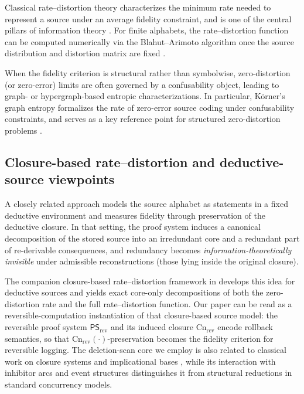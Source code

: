 \documentclass[twoside]{article}
\newcommand{\Cn}{\mathrm{Cn}}
\newcommand{\1}{\mathbf{1}}
\begin{document}
Classical rate--distortion theory characterizes the minimum rate needed to represent a source under an average fidelity constraint, and is
one of the central pillars of information theory \cite{shannon1948mathematical,shannon1959coding,cover2006elements,csizsar2011information}.
For finite alphabets, the rate--distortion function can be computed numerically via the Blahut--Arimoto algorithm once the source distribution
and distortion matrix are fixed \cite{blahut1972computation,arimoto1972algorithm}.

When the fidelity criterion is structural rather than symbolwise, zero-distortion (or zero-error) limits are often governed by a confusability
object, leading to graph- or hypergraph-based entropic characterizations.
In particular, K\"orner's graph entropy formalizes the rate of zero-error source coding under confusability constraints, and serves as a key
reference point for structured zero-distortion problems \cite{korner1971coding,csiszar2011information}.

\subsection{Closure-based rate--distortion and deductive-source viewpoints}

A closely related approach models the source alphabet as statements in a fixed deductive
environment and measures fidelity through preservation of the deductive closure.
In that setting, the proof system induces a canonical decomposition of the stored source into an irredundant core and a
redundant part of re-derivable consequences, and redundancy becomes \emph{information-theoretically invisible} under
admissible reconstructions (those lying inside the original closure).

The companion closure-based rate--distortion framework in \cite{xu2026rate} develops this idea for deductive sources
and yields exact core-only decompositions of both the zero-distortion rate and the full rate--distortion function.
Our paper can be read as a reversible-computation instantiation of that closure-based source model:
the reversible proof system \(\mathsf{PS}_{\mathrm{rev}}\) and its induced closure \(\Cn_{\mathrm{rev}}\) encode rollback semantics,
so that \(\Cn_{\mathrm{rev}}(\cdot)\)-preservation becomes the fidelity criterion for reversible logging.
The deletion-scan core we employ is also related to classical work on closure systems and implicational bases
\cite{ganter1999formal}, while its interaction with inhibitor arcs and event structures
\cite{winskel1986event,murata1989petri} distinguishes it from structural reductions in standard concurrency models.
\end{document}

